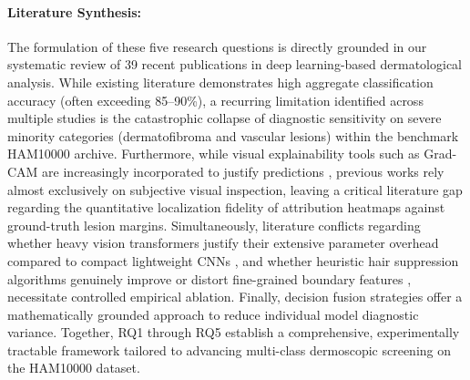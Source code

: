 \documentclass[11pt,a4paper]{article}
\begin{document}
\paragraph{Literature Synthesis:}
The formulation of these five research questions is directly grounded in our systematic review of 39 recent publications in deep learning-based dermatological analysis. While existing literature demonstrates high aggregate classification accuracy (often exceeding 85--90\%), a recurring limitation identified across multiple studies \cite{10107401, 10122533, 9810181, 9062473, 10459206, 10731679, 10608138, 10778156, 11598907} is the catastrophic collapse of diagnostic sensitivity on severe minority categories (dermatofibroma and vascular lesions) within the benchmark HAM10000 archive. Furthermore, while visual explainability tools such as Grad-CAM are increasingly incorporated to justify predictions \cite{10107401, 10731679, 10536875}, previous works rely almost exclusively on subjective visual inspection, leaving a critical literature gap regarding the quantitative localization fidelity of attribution heatmaps against ground-truth lesion margins. Simultaneously, literature conflicts regarding whether heavy vision transformers justify their extensive parameter overhead compared to compact lightweight CNNs \cite{9099799, 9791221, 10731679, 11435372}, and whether heuristic hair suppression algorithms genuinely improve or distort fine-grained boundary features \cite{9160933, 9306830, 10416953}, necessitate controlled empirical ablation. Finally, decision fusion strategies \cite{9099799, 9940917, 10608138, 9175002} offer a mathematically grounded approach to reduce individual model diagnostic variance. Together, RQ1 through RQ5 establish a comprehensive, experimentally tractable framework tailored to advancing multi-class dermoscopic screening on the HAM10000 dataset.



\end{document}
